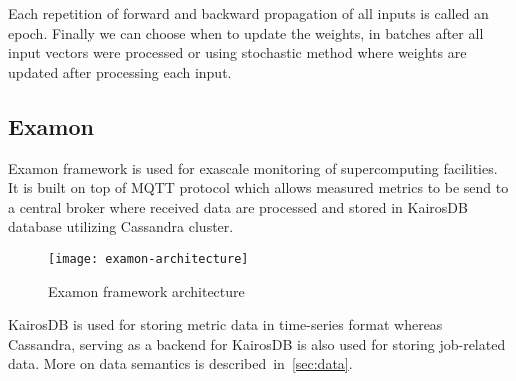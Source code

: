 Each repetition of forward and backward propagation of all inputs is called an epoch. Finally we can choose when to update the weights, in batches after all input vectors were processed or using stochastic method where weights are updated after processing each input.

\subsection{Examon}
\label{sec:examon}
Examon\cite{examon} framework is used for exascale monitoring of supercomputing facilities. It is built on top of MQTT protocol\cite{locke2010mqtt} which allows measured metrics to be send to a central broker where received data are processed and stored in KairosDB\cite{KAIROS} database utilizing Cassandra\cite{CASSANDRA} cluster.

\begin{figure}[ht]
    \centering
    \texttt{[image: examon-architecture]}
    \caption{Examon framework architecture}
    \label{arch}
\end{figure}

KairosDB is used for storing metric data in time-series format whereas Cassandra, serving as a backend for KairosDB is also used for storing job-related data. More on data semantics is described~in~\ref{sec:data}.

